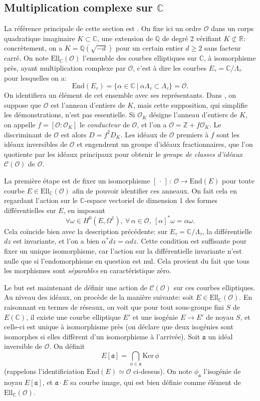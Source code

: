 \documentclass[11pt,a4paper]{article}
\newcommand{\Z}{\mathbb{Z}}
\newcommand{\C}{\mathbb{C}}
\newcommand{\Q}{\mathbb{Q}}
\newcommand{\R}{\mathbb{R}}
\renewcommand{\O}{\mathcal{O}}
\newcommand{\Cl}{\mathcal{C}}
\newcommand{\vers}{\longrightarrow}
\newcommand{\End}{\mathrm{End}}
\newcommand{\Ell}{\mathrm{Ell}}
\renewcommand{\frak}{\mathfrak}
\newcommand{\de}{\,:\,}
\renewcommand{\v}{\vspace{5mm}}
\theoremstyle{definition}
\begin{document}
\subsection{Multiplication complexe sur $\C$}


La référence principale de cette section est \cite{Sil2}. On fixe ici un ordre $\O$ dans un corps quadratique imaginaire $K\subset \C$, une extension de $\Q$ de degré 2 vérifiant $K \not\subset\R$: concrètement, on a $K=\Q(\sqrt{-d})$ pour un certain entier $d\geq 2$ sans facteur carré. On note $\Ell_\C(\O)$ l'ensemble des courbes elliptiques sur $\C$, à isomorphisme près, ayant multiplication complexe par $\O$, c'est à dire les courbes $E_\tau = \C/\Lambda_\tau$ pour lesquelles on a:
$$\End(E_\tau) = \{\alpha\in \C\ |\ \alpha\Lambda_\tau \subset \Lambda_\tau\} = \O.$$
On identifiera un élément de cet ensemble avec ses représentants. Dans \cite{Sil2}, on suppose que $\O$ est l'anneau d'entiers de $K$, mais cette supposition, qui simplifie les démonstrations, n'est pas essentielle. %
Si $\O_K$ désigne l'anneau d'entiers de $K$, on appelle $f=[\O:\O_K]$ le \emph{conducteur} de $\O$, et l'on a $\O = \Z  + f \O_K$. Le discriminant de $\O$ est alors $D = f^2 D_K$. Les idéaux de $\O$ premiers à $f$ sont les idéaux inversibles de $\O$ et engendrent un groupe d'idéaux fractionnaires, que l'on quotiente par les idéaux principaux pour obtenir le \emph{groupe de classes d'idéaux} $\Cl(\O)$ de $\O$.
\v

La première étape est de fixer un isomorphisme $[\,\cdot\,]\de \O\vers \End(E)$ pour toute courbe $E\in \Ell_\C(\O)$ afin de pouvoir identifier ces anneaux. On fait cela en regardant l'action sur le $\C$-espace vectoriel de dimension 1 des formes différentielles sur $E$, en imposant
$$\forall \omega\in H^0(E,\Omega^1),\ \forall\,\alpha\in\O,\ [\alpha]^*\omega = \alpha \omega.$$
Cela coïncide bien avec la description précédente: sur $E_\tau = \C/\Lambda_\tau$, la différentielle $dz$ est invariante, et l'on a bien $\alpha^* dz = \alpha dz$. Cette condition est suffisante pour fixer un unique isomorphisme, car l'action sur la différentielle invariante n'est nulle que si l'endomorphisme en question est nul. Cela provient du fait que tous les morphismes sont \emph{séparables} en caractéristique zéro.

Le but est maintenant de définir une action de $\Cl(\O)$ sur ces courbes elliptiques. Au niveau des idéaux, on procède de la manière suivante: soit $E\in \Ell_\C(\O)$. En raisonnant en termes de réseaux, on voit que pour tout sous-groupe fini $S$ de $E(\C)$, il existe une courbe elliptique $E'$ et une isogénie $E\vers E'$ de noyau $S$, et celle-ci est unique à isomorphisme près (on déclare que deux isogénies sont isomorphes si elles diffèrent d'un isomorphisme à l'arrivée). Soit $\frak a$ un idéal inversible de $\O$. On définit
$$E[\frak a]=\bigcap_{\phi\in \frak a} \mathrm{Ker}\,\phi$$
(rappelons l'identificiation $\End(E)\simeq\O$ ci-dessus). On note $\phi_{\frak a}$ l'isogénie de noyau $E[\frak a]$, et $\frak a\cdot E$ sa courbe image, qui est bien définie comme élément de $\Ell_\C(\O)$.
\end{document}

